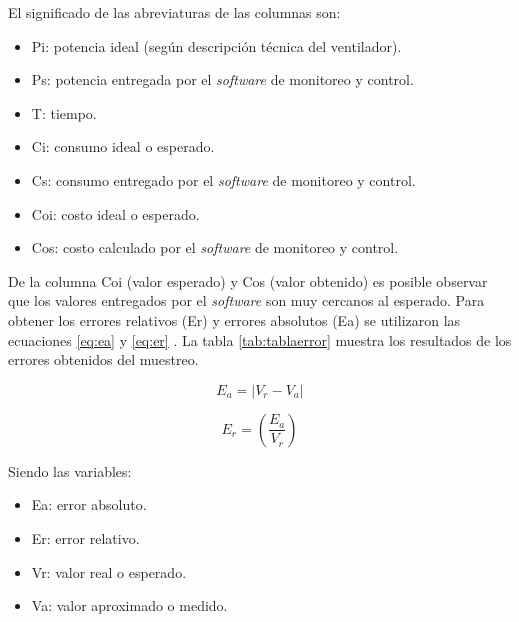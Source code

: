 \vspace{0.1cm}
El significado de las abreviaturas de las columnas son:
\begin{itemize}
\item Pi: potencia ideal (según descripción técnica del ventilador).
\item Ps: potencia entregada por el \emph{software} de monitoreo y control.
\item T: tiempo.
\item Ci: consumo ideal o esperado.
\item Cs: consumo entregado por el \emph{software} de monitoreo y control.
\item Coi: costo ideal o esperado.
\item Cos: costo calculado por el \emph{software} de monitoreo y control.
\end{itemize}

\vspace{0.1cm}
De la columna Coi (valor esperado) y Cos (valor obtenido) es posible observar que los valores entregados por el \emph{software} son muy cercanos al esperado. Para obtener los errores relativos (Er) y errores absolutos (Ea) se utilizaron las ecuaciones  \ref{eq:ea} y \ref{eq:er} . La tabla \ref{tab:tablaerror} muestra los resultados de los errores obtenidos del muestreo.



\begin{equation}
	\label{eq:ea}
	E_a = \left| V_r - V_a \right|
\end{equation}

\begin{equation}
	\label{eq:er}
	E_r = \left( \frac{E_a}{V_r} \right)
\end{equation}

Siendo las variables:
\begin{itemize}
\item Ea: error absoluto. 
\item Er: error relativo.
\item Vr: valor real o esperado.
\item Va: valor aproximado o medido.
\end{itemize}

